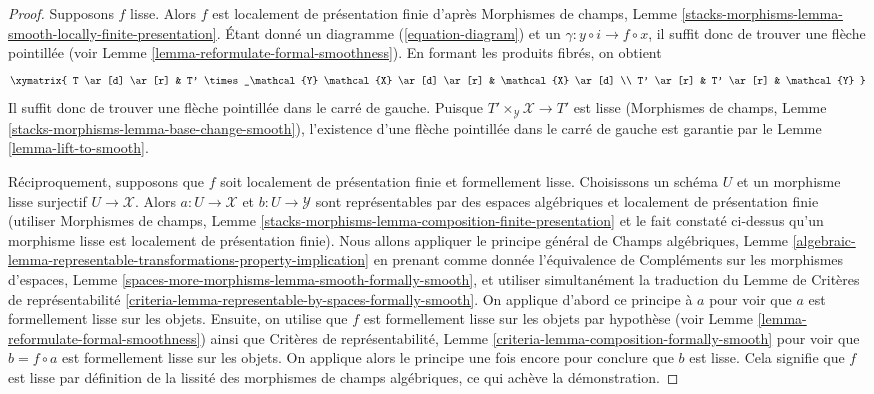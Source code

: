 \begin{proof}
Supposons $f$ lisse. Alors $f$ est localement de présentation finie d'après
Morphismes de champs, Lemme
\ref{stacks-morphisms-lemma-smooth-locally-finite-presentation}.
Étant donné un diagramme (\ref{equation-diagram})
et un $\gamma : y \circ i \to f \circ x$, il suffit donc de trouver une
flèche pointillée (voir Lemme \ref{lemma-reformulate-formal-smoothness}).
En formant les produits fibrés, on obtient
$$
\xymatrix{
T \ar[d] \ar[r] &
T' \times_\mathcal{Y} \mathcal{X} \ar[d] \ar[r] &
\mathcal{X} \ar[d] \\
T' \ar[r] & T' \ar[r] & \mathcal{Y}
}
$$
Il suffit donc de trouver une flèche pointillée dans le
carré de gauche. Puisque $T' \times_\mathcal{Y} \mathcal{X} \to T'$
est lisse
(Morphismes de champs, Lemme \ref{stacks-morphisms-lemma-base-change-smooth}),
l'existence d'une flèche pointillée dans le carré de gauche est garantie par le
Lemme \ref{lemma-lift-to-smooth}.

\medskip\noindent
Réciproquement, supposons que $f$ soit localement de présentation finie et
formellement lisse. Choisissons un schéma $U$ et un morphisme lisse surjectif
$U \to \mathcal{X}$. Alors $a : U \to \mathcal{X}$ et $b : U \to \mathcal{Y}$
sont représentables par des espaces algébriques et localement de présentation finie
(utiliser Morphismes de champs, Lemme
\ref{stacks-morphisms-lemma-composition-finite-presentation}
et le fait constaté ci-dessus
qu'un morphisme lisse est localement de présentation finie).
Nous allons appliquer le principe général de
Champs algébriques, Lemme
\ref{algebraic-lemma-representable-transformations-property-implication}
en prenant comme donnée l'équivalence de Compléments sur les morphismes d'espaces,
Lemme \ref{spaces-more-morphisms-lemma-smooth-formally-smooth},
et utiliser simultanément la traduction du
Lemme de Critères de représentabilité
\ref{criteria-lemma-representable-by-spaces-formally-smooth}.
On applique d'abord ce principe à $a$ pour voir que $a$ est
formellement lisse sur les objets. Ensuite, on utilise que $f$ est
formellement lisse sur les objets par hypothèse
(voir Lemme \ref{lemma-reformulate-formal-smoothness})
ainsi que Critères de représentabilité, Lemme
\ref{criteria-lemma-composition-formally-smooth}
pour voir que $b = f \circ a$ est formellement lisse sur les objets.
On applique alors le principe une fois encore pour conclure que $b$ est lisse.
Cela signifie que $f$ est lisse par définition de la lissité
des morphismes de champs algébriques, ce qui achève la démonstration.
\end{proof}










